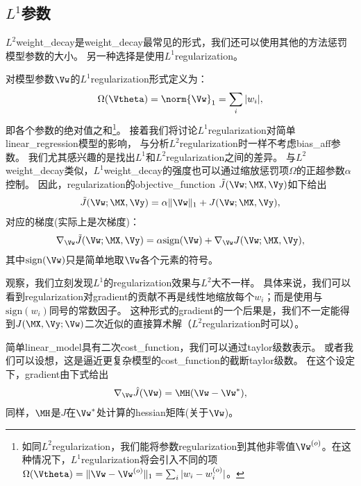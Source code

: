 \subsection{$L^1$参数}
\label{sec:l1_regularization}
$L^2$\gls{weight_decay}是\gls{weight_decay}最常见的形式，我们还可以使用其他的方法惩罚模型参数的大小。
另一种选择是使用$L^1$\gls{regularization}。

对模型参数$\Vw$的$L^1$\gls{regularization}形式定义为：
\begin{align}
 \Omega(\Vtheta) = \norm{ \Vw }_1 = \sum_i | w_i |,
 \end{align}
即各个参数的绝对值之和\footnote{如同$L^2$\gls{regularization}，我们能将参数\gls{regularization}到其他非零值$\Vw^{(o)}$。在这种情况下，$L^1$\gls{regularization}将会引入不同的项$\Omega(\Vtheta)=
\|\Vw - \Vw^{(o)} \|_1 = \sum_i | w_i - w_i^{(o)} |$。}。
接着我们将讨论$L^1$\gls{regularization}对简单\gls{linear_regression}模型的影响， 与分析$L^2$\gls{regularization}时一样不考虑\gls{bias_aff}参数。  
我们尤其感兴趣的是找出$L^1$和$L^2$\gls{regularization}之间的差异。
与$L^2$\gls{weight_decay}类似，$L^1$\gls{weight_decay}的强度也可以通过缩放惩罚项$\Omega$的正超参数$\alpha$控制。 
因此，\gls{regularization}的\gls{objective_function} $\tilde{J}(\Vw;\MX, \Vy)$如下给出
\begin{align}
\tilde{J}(\Vw;\MX, \Vy) = \alpha \| \Vw \|_1 +  J(\Vw;\MX, \Vy) ,
\end{align}
对应的梯度(实际上是次梯度)：
\begin{align}
\label{eq:subgradient}
  \nabla_{\Vw} \tilde{J}(\Vw; \MX, \Vy) = \alpha \text{sign}(\Vw) + \nabla_{\Vw} J(\Vw; \MX, \Vy), %
\end{align}
其中$\text{sign}(\Vw)$只是简单地取$\Vw$各个元素的符号。


观察，我们立刻发现$L^1$的\gls{regularization}效果与$L^2$大不一样。
具体来说，我们可以看到\gls{regularization}对\gls{gradient}的贡献不再是线性地缩放每个$w_i$；而是使用与$\text{sign}(w_i)$同号的常数因子。
这种形式的\gls{gradient}的一个后果是，我们不一定能得到$J(\MX, \Vy;\Vw)$二次近似的直接算术解（$L^2$\gls{regularization}时可以）。 
 
简单\gls{linear_model}具有二次\gls{cost_function}，我们可以通过\gls{taylor}级数表示。
或者我们可以设想，这是逼近更复杂模型的\gls{cost_function}的截断\gls{taylor}级数。
在这个设定下，\gls{gradient}由下式给出
\begin{align}
  \nabla_{\Vw} \hat{J}(\Vw) = \MH (\Vw - \Vw^*),
\end{align}
同样，$\MH$是$J$在$\Vw^*$处计算的\gls{hessian}矩阵(关于$\Vw$)。

